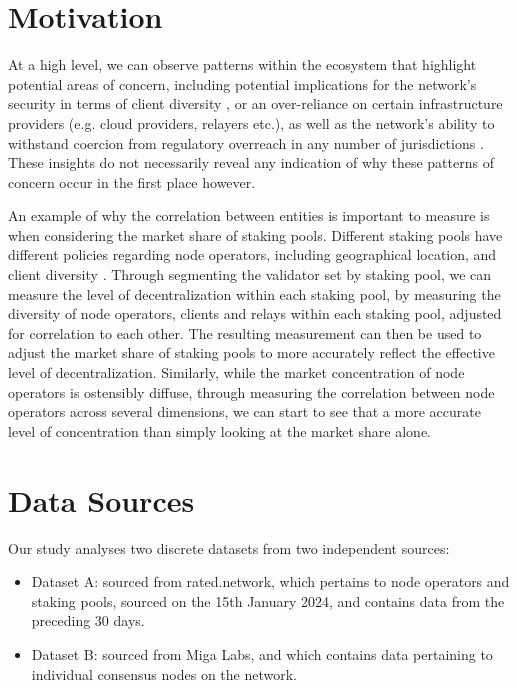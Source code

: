 \documentclass[conference]{IEEEtran}
\begin{document}
\section{Motivation}

At a high level, we can observe patterns within the ecosystem that highlight potential areas of concern, including potential implications for the network's security in terms of client diversity \cite{clientdiversity2024}, or an over-reliance on certain infrastructure providers (e.g. cloud providers, relayers etc.), as well as the network's ability to withstand coercion from regulatory overreach in any number of jurisdictions \cite{wahrstatter2023}. These insights do not necessarily reveal any indication of why these patterns of concern occur in the first place however.

An example of why the correlation between entities is important to measure is when considering the market share of staking pools. Different staking pools have different policies regarding node operators, including geographical location, and client diversity \cite{vanom2024}.  Through segmenting the validator set by staking pool, we can measure the level of decentralization within each staking pool, by measuring the diversity of node operators, clients and relays within each staking pool, adjusted for correlation to each other. The resulting measurement can then be used to adjust the market share of staking pools to more accurately reflect the effective level of decentralization.  Similarly, while the market concentration of node operators is ostensibly diffuse, through measuring the correlation between node operators across several dimensions, we can start to see that a more accurate level of concentration than simply looking at the market share alone.

\section{Data Sources}

Our study analyses two discrete datasets from two independent sources:

\begin{itemize}
    \item Dataset A: sourced from rated.network, which pertains to node operators and staking pools, sourced on the 15th January 2024, and contains data from the preceding 30 days.
    \item Dataset B: sourced from Miga Labs, and which contains data pertaining to individual consensus nodes on the network.
\end{itemize}
\end{document}
